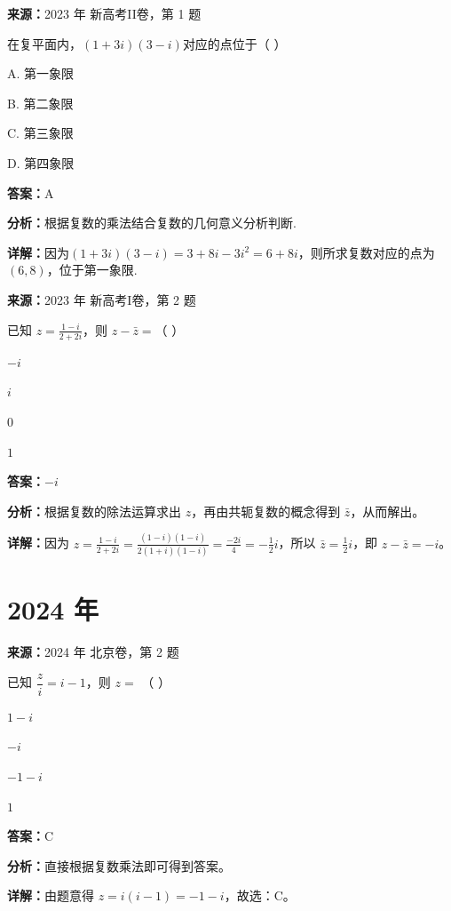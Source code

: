 \begin{question}[points=5]
\textbf{来源：}2023 年 新高考II卷，第 1 题\par
在复平面内，$(1+3i)(3-i)$对应的点位于（ \quad ）
\begin{choices}
  \item A. 第一象限
  \item B. 第二象限
  \item C. 第三象限
  \item D. 第四象限
\end{choices}
\begin{solution}
\textbf{答案：}A

\textbf{分析：}根据复数的乘法结合复数的几何意义分析判断.

\textbf{详解：}因为$(1+3i)(3-i)=3+8i-3i^2=6+8i$，则所求复数对应的点为$(6,8)$，位于第一象限.
\end{solution}
\end{question}

\begin{question}[points=5]
\textbf{来源：}2023 年 新高考I卷，第 2 题\par
已知 $z=\frac{1-i}{2+2i}$，则 $z-\bar{z}=$（ ）
\begin{choices}
  \item $-i$
  \item $i$
  \item $0$
  \item $1$
\end{choices}
\begin{solution}
\textbf{答案：}$-i$

\textbf{分析：}根据复数的除法运算求出 $z$，再由共轭复数的概念得到 $\bar{z}$，从而解出。

\textbf{详解：}因为 $z=\frac{1-i}{2+2i}=\frac{(1-i)(1-i)}{2(1+i)(1-i)}=\frac{-2i}{4}=-\frac{1}{2}i$，所以 $\bar{z}=\frac{1}{2}i$，即 $z-\bar{z}=-i$。
\end{solution}
\end{question}

\section*{2024 年}

\begin{question}[points=4]
\textbf{来源：}2024 年 北京卷，第 2 题\par
已知 $\dfrac{z}{i} = i-1$，则 $z=$ （ ）
\begin{choices}
  \item $1-i$
  \item $-i$
  \item $-1-i$
  \item $1$
\end{choices}
\begin{solution}
\textbf{答案：}C

\textbf{分析：}直接根据复数乘法即可得到答案。

\textbf{详解：}由题意得 $z = i(i-1) = -1-i$，故选：C。
\end{solution}
\end{question}

